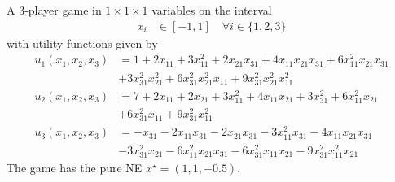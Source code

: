 \begin{game}\label{ex.stein08.3.10}
A 3-player game in $1 \times 1 \times 1$ variables on the interval
\begin{align*}
    x_i &\in [-1,1] \quad \forall i \in \{1,2,3\}
\end{align*}
with utility functions \cite[Example~3.10]{stein.ozdaglar.ea:separable} given by
\begin{align*}
u_{1}\left( x_{1}, x_{2}, x_{3} \right) &= 1 + 2 x_{11} + 3 x_{11}^{2} + 2 x_{21} x_{31} + 4 x_{11} x_{21} x_{31} + 6 x_{11}^{2} x_{21} x_{31} \\
    &+ 3 x_{31}^{2} x_{21}^{2} + 6 x_{31}^{2} x_{21}^{2} x_{11} + 9 x_{31}^{2} x_{21}^{2} x_{11}^{2} \\
u_{2}\left( x_{1}, x_{2}, x_{3} \right) &= 7 + 2 x_{11} + 2 x_{21} + 3 x_{11}^{2} + 4 x_{11} x_{21} + 3 x_{31}^{2} + 6 x_{11}^{2} x_{21} \\ & + 6 x_{31}^{2} x_{11} + 9 x_{31}^{2} x_{11}^{2} \\
u_{3}\left( x_{1}, x_{2}, x_{3} \right) &=  - x_{31} - 2 x_{11} x_{31} - 2 x_{21} x_{31} - 3 x_{11}^{2} x_{31} - 4 x_{11} x_{21} x_{31} \\&- 3 x_{31}^{2} x_{21} - 6 x_{11}^{2} x_{21} x_{31} - 6 x_{31}^{2} x_{11} x_{21} - 9 x_{31}^{2} x_{11}^{2} x_{21}
\end{align*}
The game has the pure NE $x^\star = (1, 1, -0.5)$.
\end{game}




